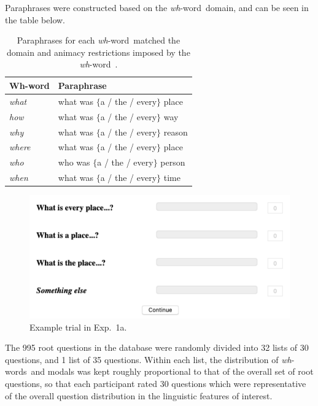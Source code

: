 \documentclass[12pt,letterpaper,table,svgnames,dvipsnames]{article}
\newcommand{\whw}{\emph{wh}-word~}
\newcommand{\whws}{\emph{wh}-words~}
\begin{document}
Paraphrases were constructed based on the \whw domain, and can be seen in the table below.

\begin{table}[h!]
    \centering
    \begin{tabular}{ll}
    \toprule
    \textbf{Wh-word} & \textbf{Paraphrase}\\
    \midrule
    \emph{what}     &  what was $\{$a / the / every$\}$ place\\
    \emph{how}      & what was $\{$a / the / every$\}$ way \\
    \emph{why}      & what was $\{$a / the / every$\}$ reason\\
    \emph{where}    & what was $\{$a / the / every$\}$ place \\
    \emph{who}      & who was $\{$a / the / every$\}$ person \\
    \emph{when}     & what was $\{$a / the / every$\}$ time \\
    \bottomrule
    \end{tabular}
    \caption{Paraphrases for each \whw matched the domain and animacy restrictions imposed by the \whw$\!$. }
    \label{tab:my_label}
\end{table}

\begin{figure}%
\centering
\includegraphics[scale=.52]{figures/sliders_rq.png}
\caption{Example trial in Exp.~1a. } %
\label{trial-ex1a}
\end{figure}

The 995 root questions in the database were randomly divided into 32 lists of 30 questions, and 1 list of 35 questions. Within each list, the distribution of \whws and modals was kept roughly proportional to that of the overall set of root questions, so that each participant rated 30 questions which were representative of the overall question distribution in the linguistic features of interest. %
\end{document}
